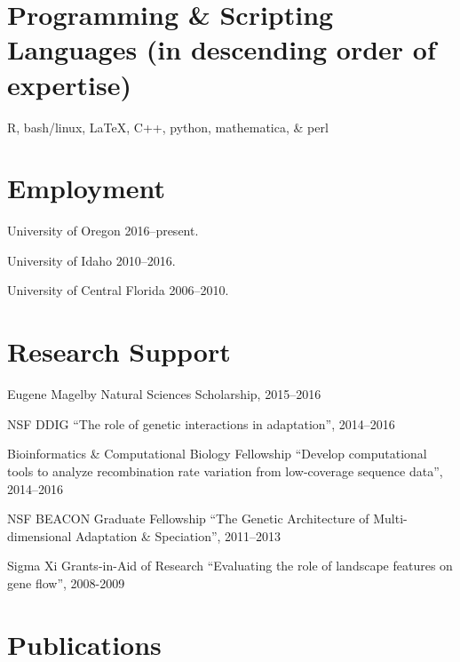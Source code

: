\documentclass[letterpaper]{article}
\renewenvironment{itemize}{
  \begin{list}{}{
    \setlength{\leftmargin}{1.5em}
  }
}{
  \end{list}
}
\begin{document}
\section*{Programming \& Scripting Languages (in descending order of expertise)}
\begin{itemize}
\item R, bash/linux, \LaTeX, C++, python, mathematica, \& perl 
\end{itemize}

\section*{Employment}

\begin{itemize}
\item University of Oregon 2016--present.
\item University of Idaho 2010--2016.
\item University of Central Florida 2006--2010.
\end{itemize}

\section*{Research Support}
\begin{itemize}
\item Eugene Magelby Natural Sciences Scholarship, 2015--2016
\item NSF DDIG ``The role of genetic interactions in adaptation'', 2014--2016
\item Bioinformatics \& Computational Biology Fellowship ``Develop computational tools to analyze recombination rate variation from low-coverage sequence data'', 2014--2016
\item NSF BEACON Graduate Fellowship ``The Genetic Architecture of Multi-dimensional Adaptation \& Speciation'', 2011--2013
\item Sigma Xi Grants-in-Aid of Research ``Evaluating the role of landscape features on gene flow'', 2008-2009
\end{itemize}


\section*{Publications}
\end{document}
